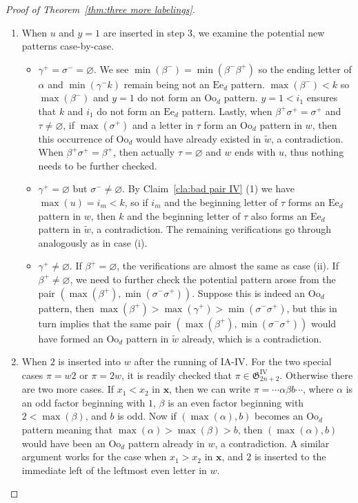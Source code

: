 \documentclass[11pt,reqno]{amsart}
\numberwithin{equation}{section}
\theoremstyle{plain}
\theoremstyle{definition}
\newcommand{\bx}{\mathbf{x}}
\newcommand{\fG}{\mathfrak{G}}
\newcommand{\GIV}{\fG^{\mathrm{IV}}}
\def\Oo{\mathrm{Oo}}
\def\Ee{\mathrm{Ee}}
\begin{document}
\begin{proof}[Proof of Theorem~\ref{thm:three more labelings}]
\begin{itemize}
\begin{enumerate}
    		
    		\item  When $u$ and $y=1$ are inserted in step 3, we examine the potential new patterns case-by-case.
    		\begin{itemize}
    			\item[(i)] $\gamma^{+}=\sigma^{-}=\varnothing$. We see $\min(\beta^{-})=\min(\beta^{-}\beta^{+})$ so the ending letter of $\alpha$ and $\min(\gamma^{-}k)$ remain being not an $\Ee_d$ pattern. $\max(\beta^{-})<k$ so $\max(\beta^{-})$ and $y=1$ do not form an $\Oo_d$ pattern. $y=1<i_1$ ensures that $k$ and $i_1$ do not form an $\Ee_d$ pattern. Lastly, when $\beta^{+}\sigma^{+}=\sigma^{+}$ and $\tau\neq\varnothing$, if $\max(\sigma^{+})$ and a letter in $\tau$ form an $\Oo_d$ pattern in $w$, then this occurrence of $\Oo_d$ would have already existed in $\tilde{w}$, a contradiction. When $\beta^{+}\sigma^{+}=\beta^{+}$, then actually $\tau=\varnothing$ and $w$ ends with $u$, thus nothing needs to be further checked.
    			\item[(ii)] $\gamma^{+}=\varnothing$ but $\sigma^{-}\neq\varnothing$. By Claim~\ref{cla:bad pair IV} (1) we have $\max(u)=i_m<k$, so if $i_m$ and the beginning letter of $\tau$ forms an $\Ee_d$ pattern in $w$, then $k$ and the beginning letter of $\tau$ also forms an $\Ee_d$ pattern in $\tilde{w}$, a contradiction. The remaining verifications go through analogously as in case (i).
    			\item[(iii)] $\gamma^{+}\neq \varnothing$. If $\beta^{+}=\varnothing$, the verifications are almost the same as case (ii). If $\beta^{+}\neq\varnothing$, we need to further check the potential pattern arose from the pair $(\max(\beta^{+}),\min(\sigma^{-}\sigma^{+}))$. Suppose this is indeed an $\Oo_d$ pattern, then $\max(\beta^{+})>\max(\gamma^{+})>\min(\sigma^{-}\sigma^{+})$, but this in turn implies that the same pair $(\max(\beta^{+}),\min(\sigma^{-}\sigma^{+}))$ would have formed an $\Oo_d$ pattern in $\tilde{w}$ already, which is a contradiction.
    		\end{itemize}
    		 
    		 
    		\item When $2$ is inserted into $w$ after the running of IA-IV. For the two special cases $\pi=w 2$ or $\pi=2 w$, it is readily checked that $\pi\in\GIV_{2n+2}$. Otherwise there are two more cases. If $x_1<x_2$ in $\bx$, then we can write $\pi=\cdots\alpha\beta b\cdots$, where $\alpha$ is an odd factor beginning with $1$, $\beta$ is an even factor beginning with $2<\max(\beta)$, and $b$ is odd. Now if $(\max(\alpha),b)$ becomes an $\Oo_d$ pattern meaning that $\max(\alpha)>\max(\beta)>b$, then $(\max(\alpha),b)$ would have been an $\Oo_d$ pattern already in $w$, a contradiction. A similar argument works for the case when $x_1>x_2$ in $\bx$, and $2$ is inserted to the immediate left of the leftmost even letter in $w$.


\end{enumerate}
\end{itemize}
\end{proof}
\end{document}
